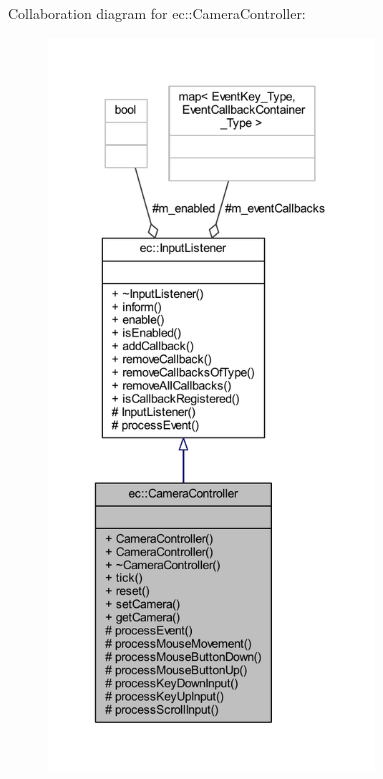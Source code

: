 Collaboration diagram for ec\+:\+:Camera\+Controller\+:\nopagebreak
\begin{figure}[H]
\begin{center}
\leavevmode
\includegraphics[height=550pt]{classec_1_1_camera_controller__coll__graph}
\end{center}
\end{figure}
